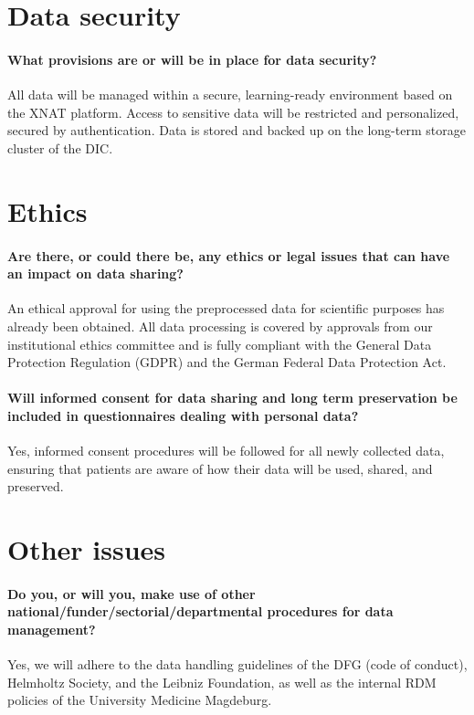 \documentclass[11pt, a4paper]{article}
\begin{document}
\section*{Data security}

\paragraph{What provisions are or will be in place for data security?}
All data will be managed within a secure, learning-ready environment based on the XNAT platform. Access to sensitive data will be restricted and personalized, secured by authentication. Data is stored and backed up on the long-term storage cluster of the DIC.

\section*{Ethics}

\paragraph{Are there, or could there be, any ethics or legal issues that can have an impact on data sharing?}
An ethical approval for using the preprocessed data for scientific purposes has already been obtained. All data processing is covered by approvals from our institutional ethics committee and is fully compliant with the General Data Protection Regulation (GDPR) and the German Federal Data Protection Act.

\paragraph{Will informed consent for data sharing and long term preservation be included in questionnaires dealing with personal data?}
Yes, informed consent procedures will be followed for all newly collected data, ensuring that patients are aware of how their data will be used, shared, and preserved.

\section*{Other issues}

\paragraph{Do you, or will you, make use of other national/funder/sectorial/departmental procedures for data management?}
Yes, we will adhere to the data handling guidelines of the DFG (code of conduct), Helmholtz Society, and the Leibniz Foundation, as well as the internal RDM policies of the University Medicine Magdeburg.
\end{document}
